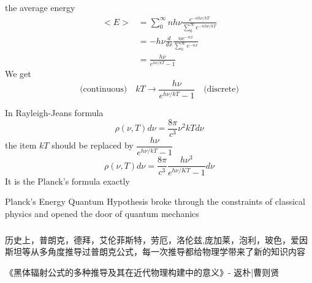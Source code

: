 \begin{frame}
    the average energy 
    \begin{equation*}
        \begin{split}
            <E> &= \sum\limits_{0}^{\infty} nh\nu\frac{e^{-nh\nu / k T}}{\sum\limits_{0}^{\infty} e^{-nh\nu / k T}} \\
            &= -h\nu \frac{d}{dx} \frac{n e^{-nx}}{\sum\limits_{0}^{\infty} e^{-nx}} \\
            &= \frac{h\nu}{e^{h\nu/kT}-1} 
        \end{split} 
    \end{equation*}
    We get
    \begin{equation*}
        \text{(continuous)} \quad k T \rightarrow \frac{h \nu}{e^{ h \nu / k T}-1} \quad \text{(discrete)} 
    \end{equation*}
\end{frame}

\begin{frame}
    In Rayleigh-Jeans formula
    \begin{equation*}
        \rho(\nu, T) d \nu=\frac{8 \pi}{c^{3}} \nu^{2} k T d \nu 
    \end{equation*}
    the item $kT$ should be replaced by $\dfrac{h \nu}{e^{ h \nu / k T}-1}$
    \begin{equation*}
        \rho(\nu, T) d \nu=\frac{8 \pi}{c^{3}} \frac{h \nu^{3}}{e^{h \nu / K T}-1} d \nu
    \end{equation*}
    It is the Planck's formula exactly 
\end{frame}

\begin{frame}
    \begin{tcolorbox4}
        Planck's Energy Quantum Hypothesis broke through the constraints of classical physics and 
        opened the door of quantum mechanics 
    \end{tcolorbox4}
\end{frame}

\begin{frame}
    \frametitle{}
    \centering
    {
    历史上，普朗克，德拜，艾伦菲斯特，劳厄，洛伦兹,庞加莱，泡利，玻色，爱因斯坦等从多角度推导过普朗克公式，每一次推导都给物理学带来了新的知识内容 
    }

 《黑体辐射公式的多种推导及其在近代物理构建中的意义》- 返朴|曹则贤
\end{frame}


